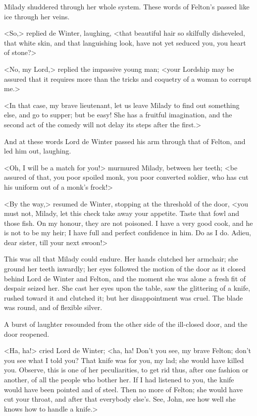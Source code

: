 Milady shuddered through her whole system. These words of Felton's passed like ice through her veins. 

<So,> replied de Winter, laughing, <that beautiful hair so skilfully disheveled, that white skin, and that languishing look, have not yet seduced you, you heart of stone?> 

<No, my Lord,> replied the impassive young man; <your Lordship may be assured that it requires more than the tricks and coquetry of a woman to corrupt me.> 

<In that case, my brave lieutenant, let us leave Milady to find out something else, and go to supper; but be easy! She has a fruitful imagination, and the second act of the comedy will not delay its steps after the first.> 

And at these words Lord de Winter passed his arm through that of Felton, and led him out, laughing. 

<Oh, I will be a match for you!> murmured Milady, between her teeth; <be assured of that, you poor spoiled monk, you poor converted soldier, who has cut his uniform out of a monk's frock!> 

<By the way,> resumed de Winter, stopping at the threshold of the door, <you must not, Milady, let this check take away your appetite. Taste that fowl and those fish. On my honour, they are not poisoned. I have a very good cook, and he is not to be my heir; I have full and perfect confidence in him. Do as I do. Adieu, dear sister, till your next swoon!> 

This was all that Milady could endure. Her hands clutched her armchair; she ground her teeth inwardly; her eyes followed the motion of the door as it closed behind Lord de Winter and Felton, and the moment she was alone a fresh fit of despair seized her. She cast her eyes upon the table, saw the glittering of a knife, rushed toward it and clutched it; but her disappointment was cruel. The blade was round, and of flexible silver. 

A burst of laughter resounded from the other side of the ill-closed door, and the door reopened. 

<Ha, ha!> cried Lord de Winter; <ha, ha! Don't you see, my brave Felton; don't you see what I told you? That knife was for you, my lad; she would have killed you. Observe, this is one of her peculiarities, to get rid thus, after one fashion or another, of all the people who bother her. If I had listened to you, the knife would have been pointed and of steel. Then no more of Felton; she would have cut your throat, and after that everybody else's. See, John, see how well she knows how to handle a knife.> 

